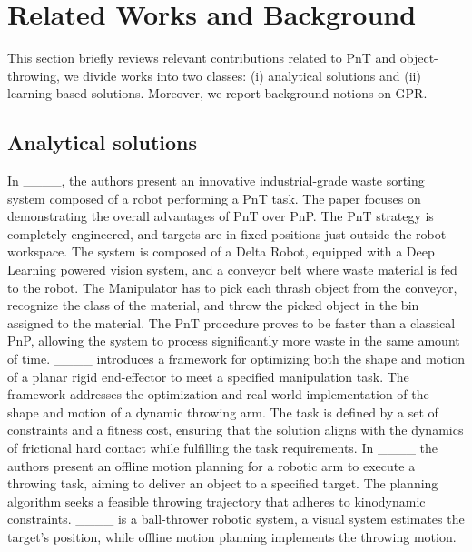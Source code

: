 \section{Related Works and Background}
\label{sec:related_work}
This section briefly reviews relevant contributions related to PnT and object-throwing, we divide works into two classes: (i) analytical solutions and (ii) learning-based solutions. Moreover, we report background notions on GPR.

\subsection{Analytical solutions}
In ____, the authors present an innovative industrial-grade waste sorting system composed of a robot performing a PnT task. The paper focuses on demonstrating the overall advantages of PnT over PnP. The PnT strategy is completely engineered, and targets are in fixed positions just outside the robot workspace. The system is composed of a Delta Robot, equipped with a Deep Learning powered vision system, and a conveyor belt where waste material is fed to the robot. The Manipulator has to pick each thrash object from the conveyor, recognize the class of the material, and throw the picked object in the bin assigned to the material. The PnT procedure proves to be faster than a classical PnP, allowing the system to process significantly more waste in the same amount of time.
____ introduces a framework for optimizing both the shape and motion of a planar rigid end-effector to meet a specified manipulation task. The framework addresses the optimization and real-world implementation of the shape and motion of a dynamic throwing arm. The task is defined by a set of constraints and a fitness cost, ensuring that the solution aligns with the dynamics of frictional hard contact while fulfilling the task requirements.
In ____ the authors present an offline motion planning for a robotic arm to execute a throwing task, aiming to deliver an object to a specified target. The planning algorithm seeks a feasible throwing trajectory that adheres to kinodynamic constraints.
____ is a ball-thrower robotic system, a visual system estimates the target's position, while offline motion planning implements the throwing motion.

